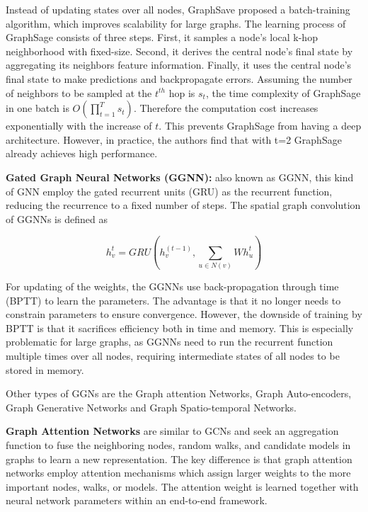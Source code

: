 Instead of updating states over all nodes, GraphSave proposed a batch-training algorithm, which improves scalability for large graphs. The learning process of GraphSage consists of three steps. First, it samples a node's local k-hop neighborhood with fixed-size. Second, it derives the central node's final state by aggregating its neighbors feature information. Finally, it uses the central node's final state to make predictions and backpropagate errors. Assuming the number of neighbors to be sampled at the $t^{th}$ hop is $s_t$, the time complexity of GraphSage in one batch is $O(\prod_{t=1}^{T}s_t)$. Therefore the computation cost increases exponentially with the increase of $t$. This prevents GraphSage from having a deep architecture. However, in practice, the authors find that with t=2 GraphSage already achieves high performance.




\textbf{Gated Graph Neural Networks (GGNN):} also known as GGNN, this kind of GNN employ the gated recurrent units (GRU) \cite{GRU} as the recurrent function, reducing the recurrence to a fixed number of steps. The spatial graph convolution of GGNNs is defined as 

$$ h_v^t = GRU(h_v^{(t-1)}, \sum_{u \in N(v)} Wh_u^t) $$

For updating of the weights, the GGNNs use back-propagation through time (BPTT) to learn the parameters. The advantage is that it no longer needs to constrain parameters to ensure convergence. However, the downside of training by BPTT is that it sacrifices efficiency both in time and memory. This  is especially problematic for large graphs, as GGNNs need to run the recurrent function multiple times over all nodes, requiring intermediate states of all nodes to be stored in memory.



Other types of GGNs are the Graph attention Networks, Graph Auto-encoders, Graph Generative Networks and Graph Spatio-temporal Networks.

\textbf{Graph Attention Networks} are similar to GCNs and seek an aggregation function to fuse the neighboring nodes, random walks, and candidate models in graphs to learn a new representation. The key difference is that graph attention networks employ attention mechanisms which assign larger weights to the more important nodes, walks, or models. The attention weight is learned together with neural network parameters within an end-to-end framework.

